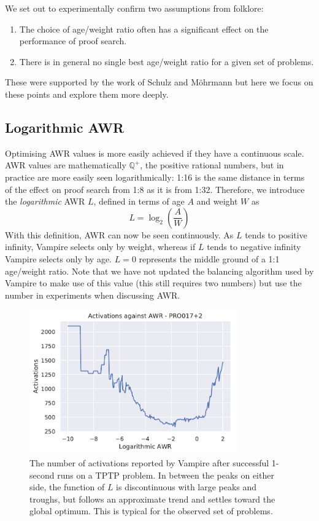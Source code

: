 \documentclass{llncs}
\newcommand{\sandm}{Schulz and M{\"{o}}hrmann}
\begin{document}
We set out to experimentally confirm two assumptions from folklore:
\begin{enumerate}
	\item The choice of age/weight ratio often has a significant effect on the performance of proof search.
	\item There is in general no single best age/weight ratio for a given set of problems.
\end{enumerate}
These were supported by the work of \sandm{} but here we focus on these points and explore them more deeply. 

\subsection{Logarithmic AWR}


Optimising AWR values is more easily achieved if they have a continuous scale.
AWR values are mathematically \(\mathbb{Q}^{+}\), the positive rational numbers, but in practice are more easily seen logarithmically: 1:16 is the same distance in terms of the effect on proof search from 1:8 as it is from 1:32.
Therefore, we introduce the \emph{logarithmic} AWR \(L\), defined in terms of age \(A\) and weight \(W\) as
\[
	L = \log_2{\left(\frac{A}{W}\right)}
\]
With this definition, AWR can now be seen continuously.
As \(L\) tends to positive infinity, Vampire selects only by weight, whereas if \(L\) tends to negative infinity Vampire selects only by age.
\(L = 0\) represents the middle ground of a 1:1 age/weight ratio. Note that we have not updated the balancing algorithm used by Vampire to make use of this value (this still requires two numbers) but use the number in experiments when discussing AWR.

\begin{figure}[t]
	\centering
	\includegraphics[width=0.8\textwidth]{example-optimal-awr}
	\caption{
The number of activations reported by Vampire after successful 1-second runs on a TPTP problem.
In between the peaks on either side, the function of \(L\) is discontinuous with large peaks and troughs, but follows an approximate trend and settles toward the global optimum.
This is typical for the observed set of problems.
}
	\label{fig:example-optimal-awr}
\end{figure}
\end{document}
